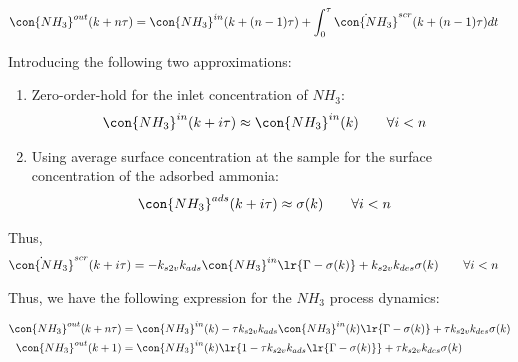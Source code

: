 \begin{align*}
    \con{NH_3}^{out} (k + n\tau) &= \con{NH_3}^{in} (k + (n-1)\tau) + \int_{0}^{\tau}  \dot{\con{NH_3}}^{scr} (k + (n-1)\tau) dt
\end{align*}

Introducing the following two approximations:
\begin{enumerate}
    \item Zero-order-hold for the inlet concentration of $NH_3$:
        \begin{align*}
            \con{NH_3}^{in} (k + i \tau) &\approx \con{NH_3}^{in} (k) \qquad \forall i < n
        \end{align*}
    \item Using average surface concentration at the sample for the surface concentration of the adsorbed ammonia:
        \begin{align*}
            \con{NH_3}^{ads} (k + i \tau) &\approx \sigma(k) \qquad \forall i < n
        \end{align*}
\end{enumerate}

Thus,
\begin{align*}
    \dot{\con{NH_3}}^{scr} (k + i \tau) &= -k_{s2v}k_{ads} \con{NH_3}^{in} \lr{\Gamma - \sigma(k)} + k_{s2v} k_{des} \sigma(k)
    \qquad \forall i < n
\end{align*}


Thus, we have the following expression for the $NH_3$ process dynamics:

\begin{align*}
    \con{NH_3}^{out} (k + n\tau) &= \con{NH_3}^{in} (k) - \tau k_{s2v}k_{ads} \con{NH_3}^{in}(k) \lr{\Gamma - \sigma(k)} + \tau k_{s2v} k_{des} \sigma(k)\\
    \con{NH_3}^{out} (k + 1) &= \con{NH_3}^{in}(k) \lr{1 - \tau k_{s2v}k_{ads} \lr{\Gamma - \sigma(k)}} + \tau k_{s2v} k_{des} \sigma(k)
\end{align*}
